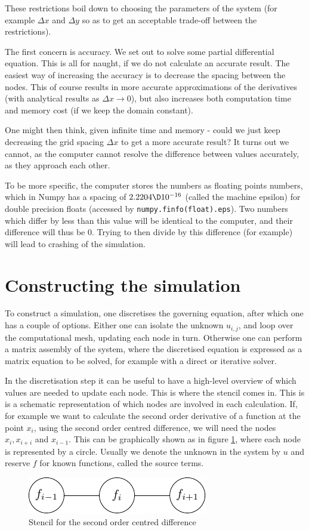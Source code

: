 \documentclass[sigconf]{acmart}
\begin{document}
These restrictions boil down to choosing the parameters of the system (for example $ \Delta x $ and $ \Delta y $ so as to get an acceptable trade-off between the restrictions).

The first concern is accuracy. We set out to solve some partial differential equation. This is all for naught, if we do not calculate an accurate result. The easiest way of increasing the accuracy is to decrease the spacing between the nodes. This of course results in more accurate approximations of the derivatives (with analytical results as $ \Delta x \to 0 $), but also increases both computation time and memory cost (if we keep the domain constant).

One might then think, given infinite time and memory - could we just keep decreasing the grid spacing $ \Delta x $ to get a more accurate result? It turns out we cannot, as the computer cannot resolve the difference between values accurately, as they approach each other.

To be more specific, the computer stores the numbers as floating points numbers, which in Numpy has a spacing of $ 2.2204 \D 10^{-16} $ (called the machine epsilon) for double precision floats (accessed by \texttt{numpy.finfo(float).eps}). Two numbers which differ by less than this value will be identical to the computer, and their difference will thus be 0. Trying to then divide by this difference (for example) will lead to crashing of the simulation.

\section{Constructing the simulation}
To construct a simulation, one discretises the governing equation, after which one has a couple of options. Either one can isolate the unknown $ u_{i,j} $, and loop over the computational mesh, updating each node in turn. Otherwise one can perform a matrix assembly of the system, where the discretised equation is expressed as a matrix equation to be solved, for example with a direct or iterative solver.  

In the discretisation step it can be useful to have a high-level overview of which values are needed to update each node. This is where the stencil comes in. This is is a schematic representation of which nodes are involved in each calculation. If, for example we want to calculate the second order derivative of a function at the point $ x_i $, using the second order centred difference, we will need the nodes $ x_i, x_{i+i} $ and $ x_{i-1} $. This can be graphically shown as in figure \ref{fig:stencil1}, where each node is represented by a circle. Usually we denote the unknown in the system by $ u $ and reserve $ f $ for known functions, called the source terms.
\begin{figure}
	\centering
	\includegraphics{stencil1.pdf}
	\caption{Stencil for the second order centred difference}
	\label{fig:stencil1}
\end{figure}
\end{document}
